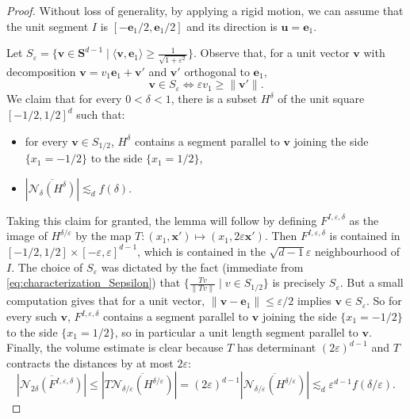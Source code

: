\documentclass[10pt]{amsart}
\begin{document}
\begin{proof}
  Without loss of generality, by applying a rigid motion, we can assume that the unit segment $I$ is $[-\mathbf{e}_1/2,\mathbf{e}_1/2]$ and its direction is $\mathbf{u}=\mathbf{e}_1$.

  Let $S_\varepsilon = \{\mathbf{v} \in \mathbf{S}^{d-1} \mid \langle \mathbf{v},\mathbf{e}_1\rangle \geq \frac{1}{\sqrt{1+\varepsilon^2}}\}$. Observe that, for a unit vector $\mathbf{v}$ with decomposition $\mathbf{v} = v_1 \mathbf{e}_1+ \mathbf{v}'$ and $\mathbf{v}'$ orthogonal to $\mathbf{e}_1$,
  \begin{equation}\label{eq:characterization_Sepsilon} \mathbf{v} \in S_\varepsilon \iff \varepsilon v_1 \geq \|\mathbf{v'}\|.
  \end{equation}
  We claim that for every $0<\delta<1$, there is a subset $H^\delta$ of the unit square $[-1/2,1/2]^d$ such that:
  \begin{itemize}
  \item for every $\mathbf v \in S_{1/2}$, $H^\delta$ contains a segment parallel to $\mathbf v$ joining the side $\{x_1=-1/2\}$ to the side $\{x_1=1/2\}$,
    \item $|\overline{\mathcal{N}_{\delta}(H^{\delta})}|\lesssim_d f(\delta)$.
  \end{itemize}
  Taking this claim for granted, the lemma will follow by defining $F^{I,\varepsilon,\delta}$ as the image of $H^{\delta/\varepsilon}$ by the map $T:(x_1,\mathbf{x}')\mapsto (x_1, 2 \varepsilon \mathbf{x}')$. Then $F^{I,\varepsilon,\delta}$ is contained in $[-1/2,1/2]\times [-\varepsilon,\varepsilon]^{d-1}$, which is contained in the $\sqrt{d-1} \varepsilon$ neighbourhood of $I$. The choice of $S_\varepsilon$ was dictated by the fact (immediate from \eqref{eq:characterization_Sepsilon}) that $\{\frac{Tv}{\|Tv\|}\mid v \in S_{1/2}\}$ is precisely $S_{\varepsilon}$. But a small computation gives that for a unit vector, $\|\mathbf{v}-\mathbf{e}_1\|\leq \varepsilon/2$ implies $\mathbf{v} \in S_{\varepsilon}$. So for every such $\mathbf{v}$, $F^{I,\varepsilon,\delta}$ contains a segment parallel to $\mathbf{v}$ joining the side $\{x_1=-1/2\}$ to the side $\{x_1=1/2\}$, so in particular a unit length segment parallel to $\mathbf{v}$. Finally, the volume estimate is clear because $T$ has determinant $(2\varepsilon)^{d-1}$ and $T$ contracts the distances by at most $2\varepsilon$:
  \[ |\overline{\mathcal{N}_{2\delta}(F^{I,\varepsilon,\delta})}| \leq |T \overline{\mathcal{N}_{\delta/\varepsilon}(H^{\delta/\varepsilon})}| = (2\varepsilon)^{d-1}|\overline{\mathcal{N}_{\delta/\varepsilon}(H^{\delta/\varepsilon})}| \lesssim_d \varepsilon^{d-1} f(\delta/\varepsilon).\]


\end{proof}
\end{document}
